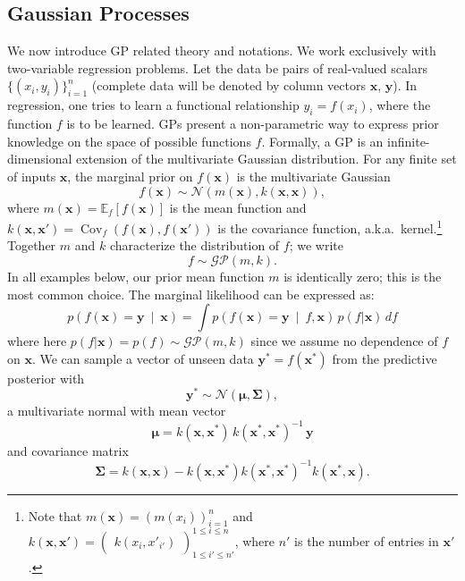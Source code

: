 \documentclass{article} %
\newcommand{\xbf}{\mathbf{x}}
\newcommand{\ybf}{\mathbf{y}}
\newcommand{\pn}[1]{\left( #1 \right)}
\newcommand{\bkt}[1]{\left[ #1 \right]}
\newcommand{\Ebkt}[2][]{\mathbb{E}_{#1}\bkt{#2}}
\newcommand{\mvert}{\ \middle\vert\ }
\DeclareMathOperator*{\Cov}{Cov}
\begin{document}
\subsection{Gaussian Processes}
We now introduce GP related theory and notations.
We work exclusively with two-variable regression problems.
Let the data be pairs of real-valued scalars $\{(x_i,y_i)\}_{i=1}^n$ (complete data will be denoted by column vectors $\mathbf{x}$, $\mathbf{y}$).
In regression, one tries to learn a functional relationship $y_i = f(x_i)$, where the function $f$ is to be learned.
GPs present a non-parametric way to express prior knowledge on the space of possible functions $f$.
Formally, a GP is an infinite-dimensional extension of the multivariate Gaussian distribution.
For any finite set of inputs $\xbf$, the marginal prior on $f(\xbf)$ is the multivariate Gaussian
\[
f(\xbf) \sim \mathcal{N}(m(\xbf), k(\xbf,\xbf)),
\]
where $m(\xbf) = \Ebkt[f]{f(\xbf)}$ is the mean function and $k(\xbf,\xbf') = \Cov_f\pn{f(\xbf), f(\xbf')}$ is the covariance function, a.k.a.\ kernel.\footnote{
  Note that $m(\xbf) = \pn{m(x_i)}_{i=1}^{n}$ and $k(\xbf,\xbf') = \begin{pmatrix} k(x_i,x'_{i'}) \end{pmatrix}^{1 \leq i \leq n}_{1 \leq i' \leq n'}$, where $n'$ is the number of entries in $\xbf'$.
}
Together $m$ and $k$ characterize the distribution of $f$; we write
\[ f \sim \mathcal{GP}(m,k). \]
In all examples below, our prior mean function $m$ is identically zero; this is the most common choice.
The marginal likelihood can be expressed as:
\begin{equation}
\label{eq:marg}
p\pn{f(\xbf) = \ybf \mvert \xbf} = \int p\pn{f(\xbf) = \ybf \mvert f, \xbf}\, p(f|\xbf) \, df
\end{equation}
where here $p(f|\xbf) = p(f) \sim \mathcal{GP}(m,k)$ since we assume no dependence of $f$ on $\xbf$.
We can sample a vector of unseen data $\ybf^* = f(\xbf^*)$ from the predictive posterior with
\begin{equation}
\label{eq:gpsampler}
\ybf^* \sim \mathcal{N}(\bm{\mu},\bm{\Sigma}),
\end{equation}
a multivariate normal with mean vector
\begin{equation}
\label{eq:conditonalGaussianMean}
\bm{\mu} = k(\xbf,\xbf^*)\, k(\xbf^*,\xbf^*)^{-1}\, \ybf
\end{equation}
and covariance matrix
\begin{equation}
\label{eq:conditonalGaussianCovariance}
\bm{\Sigma} =  k(\xbf,\xbf) - k(\xbf,\xbf^*)k(\xbf^*,\xbf^*)^{-1} k(\xbf^*,\xbf).
\end{equation}
\end{document}
